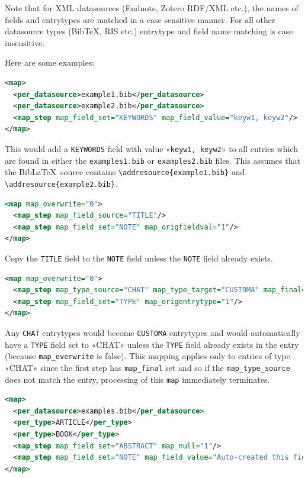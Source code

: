 \documentclass{ltxdockit}
\begin{document}
\noindent Note that for XML datasources (Endnote, Zotero RDF/XML etc.), the names of
fields and entrytypes are matched in a case sensitive manner. For all other
datasource types (Bib\TeX, RIS etc.) entrytype and field name matching is
case insensitive.

\noindent Here are some examples:

\begin{lstlisting}[language=xml,escapechar=+,mathescape=true]
<map>
  <per_datasource>example1.bib</per_datasource>
  <per_datasource>example2.bib</per_datasource>
  <map_step map_field_set="KEYWORDS" map_field_value="keyw1, keyw2"/>
</map>
\end{lstlisting}

\noindent This would add a \verb+KEYWORDS+ field with value «\verb+keyw1, keyw2+»
to all entries which are found in either the
\verb+examples1.bib+ or \verb+examples2.bib+ files. This assumes that the
Bib\LaTeX\ source contains \verb+\addresource{example1.bib}+ and
\linebreak\verb+\addresource{example2.bib}+.

\begin{lstlisting}[language=xml,escapechar=+,mathescape=true]
<map map_overwrite="0">
  <map_step map_field_source="TITLE"/>
  <map_step map_field_set="NOTE" map_origfieldval="1"/>
</map>
\end{lstlisting}

\noindent Copy the \verb+TITLE+ field to the \verb+NOTE+ field unless the
\verb+NOTE+ field already exists.

\begin{lstlisting}[language=xml,escapechar=+,mathescape=true]
<map map_overwrite="0">
  <map_step map_type_source="CHAT" map_type_target="CUSTOMA" map_final="1"/>
  <map_step map_field_set="TYPE" map_origentrytype="1"/>
</map>
\end{lstlisting}

\noindent Any \verb+CHAT+ entrytypes would become \verb+CUSTOMA+ entrytypes and 
would automatically have a \verb+TYPE+ field set to 
«CHAT» unless the \verb+TYPE+ field already exists in the entry (because
\verb+map_overwrite+ is false). This mapping applies only to entries of type
«CHAT» since the first step has \verb+map_final+ set and so if the
\verb+map_type_source+ does not match the entry, processing of this
\verb+map+ immediately terminates.

\begin{lstlisting}[language=xml,escapechar=+,mathescape=true]
<map>
  <per_datasource>examples.bib</per_datasource>
  <per_type>ARTICLE</per_type>
  <per_type>BOOK</per_type>
  <map_step map_field_set="ABSTRACT" map_null="1"/>
  <map_step map_field_set="NOTE" map_field_value="Auto-created this field"/>
</map>
\end{lstlisting}
\end{document}
